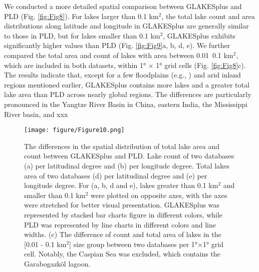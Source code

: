 \documentclass[preprint,12pt,authoryear]{elsarticle}
\begin{document}
We conducted a more detailed spatial comparison between GLAKESplus and PLD (Fig. \ref{fig:Fig8}). For lakes larger than 0.1 km$^2$, the total lake count and area distributions along latitude and longitude in GLAKESplus are generally similar to those in PLD, but for lakes smaller than 0.1 km$^2$, GLAKESplus exhibits significantly higher values than PLD (Fig. \ref{fig:Fig9}a, b, d, e). We further compared the total area and count of lakes with area between 0.01~0.1 km$^2$, which are included in both datasets, within 1° × 1° grid cells (Fig. \ref{fig:Fig8}c). The results indicate that, except for a few floodplains (e.g., ) and arid inland regions mentioned earlier, GLAKESplus contains more lakes and a greater total lake area than PLD across nearly global regions. The differences are particularly pronounced in the Yangtze River Basin in China, eastern India, the Mississippi River basin, and xxx 

\begin{figure}[t]
    \centering
    \texttt{[image: figure/Figure10.png]}
    \caption{The differences in the spatial distribution of total lake area and count between GLAKESplus and PLD. Lake count of two databases (a) per latitudinal degree and (b) per longitude degree. Total lakes area of two databases (d) per latitudinal degree and (e) per longitude degree. For (a, b, d and e), lakes greater than 0.1 km$^2$ and smaller than 0.1 km$^2$ were plotted on opposite axes, with the axes were stretched for better visual presentation. GLAKESplus was represented by stacked bar charts figure in different colors, while PLD was represented by line charts in different colors and line widths. (c) The difference of count and total area of lakes in the [0.01 - 0.1 km$^2$] size group between two databases per 1°×1° grid cell. Notably, the Caspian Sea was excluded, which contains the Garabogazköl lagoon.}
    \label{fig:Fig10}
\end{figure}
\end{document}
